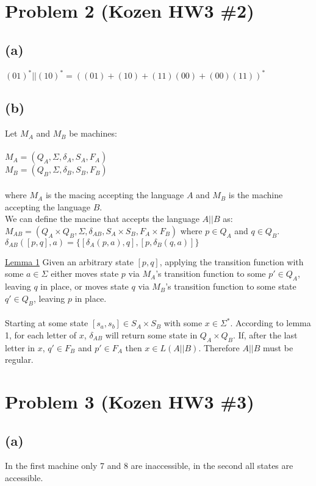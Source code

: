\documentclass[11pt, a4paper, oneside]{article}
\begin{document}
\section*{Problem 2 (Kozen HW3 \#2)}
\subsection*{(a)}
$(01)^* || (10)^* = ((01) + (10) + (11)(00) + (00)(11))^*$

\subsection*{(b)}
Let $M_A$ and $M_B$ be machines: \\
\\
$M_A = (Q_A, \Sigma, \delta _A, S_A, F_A)$\\
$M_B = (Q_B, \Sigma, \delta _B, S_B, F_B)$\\
\\
where $M_A$ is the macing accepting the language $A$ and $M_B$ is the machine
accepting the language $B$. \\
We can define the macine that accepts the language $A||B$ as: \\

$M_{AB} = (Q_A \times Q_B, \Sigma, \delta _{AB}, S_A \times S_B, F_A \times F_B)$ 
where $p \in Q_A$ and $q \in Q_B$. \\

$\delta _{AB} ([p,q],a) = \{[\delta _A (p,a),q],[p, \delta _B (q,a)]\}$

\underline{Lemma 1}
Given an arbitrary state $[p,q]$, applying the transition function with 
some $a \in \Sigma$ either moves state $p$ via $M_A$'s transition function
to some $p' \in Q_A$, leaving $q$ in place, or moves state $q$ via $M_B$'s
transition function to some state $q' \in Q_B$, leaving $p$ in place.\\
\\
Starting at some state $[s_a, s_b] \in S_A \times S_B$ with some $x \in \Sigma^*$.
According to lemma 1, for each letter of $x$, $\delta _{AB}$ will return some 
state in $Q_A \times Q_B$. If, after the last letter in $x$, $q' \in F_B$ and 
$p' \in F_A$ then $x \in L(A||B)$. Therefore $A||B$ must be regular.


\section*{Problem 3 (Kozen HW3 \#3)}
\subsection*{(a)}
In the first machine only 7 and 8 are inaccessible, in the second all states 
are accessible.
\end{document}
